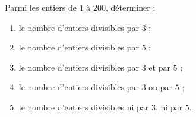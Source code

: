Parmi les entiers de $1$ à $200$, déterminer :
\begin{enumerate}
  \item le nombre d'entiers divisibles par $3$ ;
  \item le nombre d'entiers divisibles par $5$ ;
  \item le nombre d'entiers divisibles par $3$ et par $5$ ;
  \item le nombre d'entiers divisibles par $3$ ou par $5$ ;
  \item le nombre d'entiers divisibles ni par $3$, ni par $5$.
\end{enumerate}
